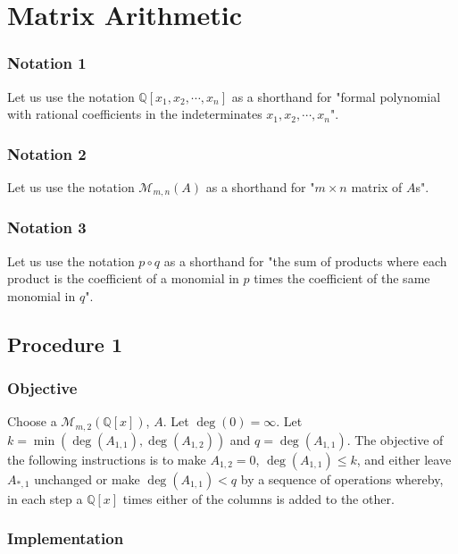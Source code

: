 \documentclass[twocolumn]{article}
\newcommand{\notation}[1]{\subsubsection*{Notation #1}}
\newcommand{\procedure}[2][]{\subsection*{Procedure #2 \ifthenelse{\equal{#1}{}}{}{(#1)}}\label{sec:procedure #2}}
\newcommand{\objective}{\subsubsection*{Objective}}
\newcommand{\implementation}{\subsubsection*{Implementation}}
\begin{document}
	\section{Matrix Arithmetic}\label{sec:body}
		\notation{1}
			Let us use the notation $\mathbb{Q}[x_1,x_2,\cdots,x_n]$ as a shorthand for "formal polynomial with rational coefficients in the indeterminates $x_1,x_2,\cdots,x_n$".
		\notation{2}
			Let us use the notation $\mathcal{M}_{m,n}(A)$ as a shorthand for "$m\times n$ matrix of $A$s".
		\notation{3}
			Let us use the notation $p\circ q$ as a shorthand for "the sum of products where each product is the coefficient of a monomial in $p$ times the coefficient of the same monomial in $q$".
		\procedure{1}
			\objective
				Choose a $\mathcal{M}_{m,2}(\mathbb{Q}[x])$, $A$. Let $\deg(0)=\infty$. Let $k=\min(\deg(A_{1,1}),\deg(A_{1,2}))$ and $q=\deg(A_{1,1})$. The objective of the following instructions is to make $A_{1,2}=0$, $\deg(A_{1,1})\le k$, and either leave $A_{*,1}$ unchanged or make $\deg(A_{1,1})<q$ by a sequence of operations whereby, in each step a $\mathbb{Q}[x]$ times either of the columns is added to the other.
			\implementation
\end{document}
